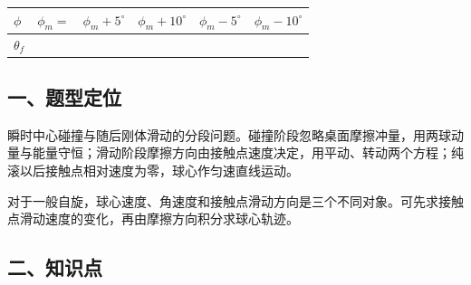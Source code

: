 \documentclass[12pt,a4paper,fontset=fandol]{ctexart}
\begin{document}
{\def\LTcaptype{table} %
\begin{longtable}[]{@{}
  >{\raggedright\arraybackslash}p{}
  >{\raggedright\arraybackslash}p{}
  >{\raggedright\arraybackslash}p{}
  >{\raggedright\arraybackslash}p{}
  >{\raggedright\arraybackslash}p{}
  >{\raggedright\arraybackslash}p{}@{}}
\toprule\noalign{}
\begin{minipage}[b]{\linewidth}\raggedright
\(\phi\)
\end{minipage} & \begin{minipage}[b]{\linewidth}\raggedright
\(\phi_m=\)
\end{minipage} & \begin{minipage}[b]{\linewidth}\raggedright
\(\phi_m+5^\circ\)
\end{minipage} & \begin{minipage}[b]{\linewidth}\raggedright
\(\phi_m+10^\circ\)
\end{minipage} & \begin{minipage}[b]{\linewidth}\raggedright
\(\phi_m-5^\circ\)
\end{minipage} & \begin{minipage}[b]{\linewidth}\raggedright
\(\phi_m-10^\circ\)
\end{minipage} \\
\midrule\noalign{}
\endhead
\bottomrule\noalign{}
\endlastfoot
\(\theta_f\) & & & & & \\
\end{longtable}
}

\subsection{一、题型定位}\label{ux4e00ux9898ux578bux5b9aux4f4d-1}

瞬时中心碰撞与随后刚体滑动的分段问题。碰撞阶段忽略桌面摩擦冲量，用两球动量与能量守恒；滑动阶段摩擦方向由接触点速度决定，用平动、转动两个方程；纯滚以后接触点相对速度为零，球心作匀速直线运动。

对于一般自旋，球心速度、角速度和接触点滑动方向是三个不同对象。可先求接触点滑动速度的变化，再由摩擦方向积分求球心轨迹。

\subsection{二、知识点}\label{ux4e8cux77e5ux8bc6ux70b9-1}
\end{document}

